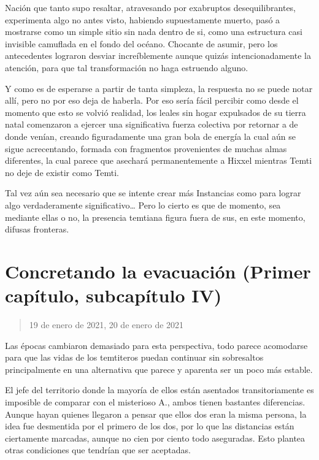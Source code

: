 \documentclass[
  spanish,
]{book}
\begin{document}
Nación que tanto supo resaltar, atravesando por exabruptos desequilibrantes, experimenta algo no antes visto, habiendo supuestamente muerto, pasó a mostrarse como un simple sitio sin nada dentro de si, como una estructura casi invisible camuflada en el fondo del océano. Chocante de asumir, pero los antecedentes lograron desviar increíblemente aunque quizás intencionadamente la atención, para que tal transformación no haga estruendo alguno.

Y como es de esperarse a partir de tanta simpleza, la respuesta no se puede notar allí, pero no por eso deja de haberla. Por eso sería fácil percibir como desde el momento que esto se volvió realidad, los leales sin hogar expulsados de su tierra natal comenzaron a ejercer una significativa fuerza colectiva por retornar a de donde venían, creando figuradamente una gran bola de energía la cual aún se sigue acrecentando, formada con fragmentos provenientes de muchas almas diferentes, la cual parece que asechará permanentemente a Hixxel mientras Temti no deje de existir como Temti.

Tal vez aún sea necesario que se intente crear más Instancias como para lograr algo verdaderamente significativo\ldots{} Pero lo cierto es que de momento, sea mediante ellas o no, la presencia temtiana figura fuera de sus, en este momento, difusas fronteras.

\hypertarget{concretando-la-evacuaciuxf3n-primer-capuxedtulo-subcapuxedtulo-iv}{%
\section{Concretando la evacuación (Primer capítulo, subcapítulo IV)}\label{concretando-la-evacuaciuxf3n-primer-capuxedtulo-subcapuxedtulo-iv}}

\begin{quote}
19 de enero de 2021, 20 de enero de 2021
\end{quote}

Las épocas cambiaron demasiado para esta perspectiva, todo parece acomodarse para que las vidas de los temtiteros puedan continuar sin sobresaltos principalmente en una alternativa que parece y aparenta ser un poco más estable.

El jefe del territorio donde la mayoría de ellos están asentados transitoriamente es imposible de comparar con el misterioso A., ambos tienen bastantes diferencias. Aunque hayan quienes llegaron a pensar que ellos dos eran la misma persona, la idea fue desmentida por el primero de los dos, por lo que las distancias están ciertamente marcadas, aunque no cien por ciento todo aseguradas. Esto plantea otras condiciones que tendrían que ser aceptadas.
\end{document}
